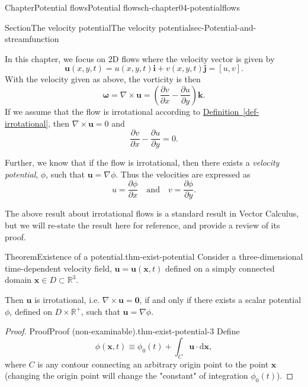 \documentclass[oneside,10pt,]{book}
\newcommand{\xreffont}{\relax}
\numberwithin{equation}{section}
\newcommand{\de}{\mathrm{d}}
\newcommand{\pd}[2]{\frac{\partial#1}{\partial#2}}
\newcommand{\bx}{\boldsymbol{x}}
\newcommand{\bu}{\boldsymbol{u}}
\newcommand{\bomega}{\boldsymbol{\omega}}
\newcommand{\bi}{\boldsymbol{i}}
\newcommand{\bj}{\boldsymbol{j}}
\newcommand{\bk}{\boldsymbol{k}}
\begin{document}
\begin{chapterptx}{Chapter}{Potential flows}{}{Potential flows}{}{}{ch-chapter04-potentialflows}
\begin{sectionptx}{Section}{The velocity potential}{}{The velocity potential}{}{}{sec-Potential-and-streamfunction}
\begin{introduction}{}%
In this chapter, we focus on 2D flows where the velocity vector is given by%
\begin{equation*}
\bu(x, y, t) = u(x, y, t)\bi + v(x, y, t)\bj = [u, v].
\end{equation*}
With the velocity given as above, the vorticity is then%
\begin{equation}
\bomega = \nabla \times \bu = \left(\pd{v}{x} - \pd{u}{y}\right)\bk.\label{eqn-2d-vorticity}
\end{equation}
If we assume that the flow is irrotational according to \hyperref[def-irrotational]{Definition~{\xreffont\ref{def-irrotational}}}, then \(\nabla \times \bu = 0\) and%
\begin{equation}
\pd{v}{x} - \pd{u}{y} = 0.\label{eqn-2d-irrotational}
\end{equation}
%
\par
Further, we know that if the flow is irrotational, then there exists a \emph{velocity potential}, \(\phi\), such that \(\bu = \nabla \phi\). Thus the velocities are expressed as%
\begin{equation}
u = \pd{\phi}{x} \quad \textrm{and} \quad v = \pd{\phi}{y}.\label{eqn-vel-potential}
\end{equation}
%
\par
The above result about irrotational flows is a standard result in Vector Calculus, but we will re-state the result here for reference, and provide a review of its proof.%
\begin{theorem}{Theorem}{Existence of a potential.}{}{thm-exist-potential}%
Consider a three-dimensional time-dependent velocity field, \(\bu = \bu(\bx, t)\) defined on a simply connected domain \(\bx\in D \subset \mathbb{R}^3\).%
\par
Then \(\bu\) is irrotational, i.e. \(\nabla \times \bu = \mathbf{0}\), if and only if there exists a scalar potential \(\phi\), defined on \(D \times \mathbb{R}^+\), such that \(\bu = \nabla \phi\).%
\end{theorem}
\begin{proof}{Proof}{Proof (non-examinable).}{thm-exist-potential-3}
Define%
\begin{equation*}
\phi(\bx, t) \equiv \phi_0(t) + \int_C \bu \cdot \de\bx,
\end{equation*}
where \(C\) is any contour connecting an arbitrary origin point to the point \(\bx\) (changing the origin point will change the "constant" of integration \(\phi_0(t)\)).%
\par

\end{proof}
\end{introduction}
\end{sectionptx}
\end{chapterptx}
\end{document}
